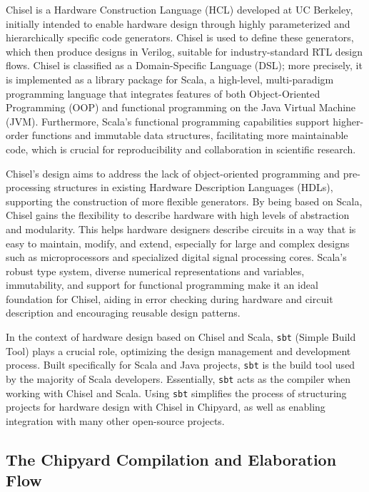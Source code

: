 Chisel is a Hardware Construction Language (HCL) developed at UC Berkeley, initially intended to enable hardware design through highly parameterized and hierarchically specific code generators. Chisel is used to define these generators, which then produce designs in Verilog, suitable for industry-standard RTL design flows. Chisel is classified as a Domain-Specific Language (DSL); more precisely, it is implemented as a library package for Scala, a high-level, multi-paradigm programming language that integrates features of both Object-Oriented Programming (OOP) and functional programming on the Java Virtual Machine (JVM). Furthermore, Scala's functional programming capabilities support higher-order functions and immutable data structures, facilitating more maintainable code, which is crucial for reproducibility and collaboration in scientific research.

Chisel's design aims to address the lack of object-oriented programming and pre-processing structures in existing Hardware Description Languages (HDLs), supporting the construction of more flexible generators. By being based on Scala, Chisel gains the flexibility to describe hardware with high levels of abstraction and modularity. This helps hardware designers describe circuits in a way that is easy to maintain, modify, and extend, especially for large and complex designs such as microprocessors and specialized digital signal processing cores. Scala's robust type system, diverse numerical representations and variables, immutability, and support for functional programming make it an ideal foundation for Chisel, aiding in error checking during hardware and circuit description and encouraging reusable design patterns.

In the context of hardware design based on Chisel and Scala, \texttt{sbt} (Simple Build Tool) plays a crucial role, optimizing the design management and development process. Built specifically for Scala and Java projects, \texttt{sbt} is the build tool used by the majority of Scala developers. Essentially, \texttt{sbt} acts as the compiler when working with Chisel and Scala. Using \texttt{sbt} simplifies the process of structuring projects for hardware design with Chisel in Chipyard, as well as enabling integration with many other open-source projects.

\subsection{The Chipyard Compilation and Elaboration Flow}
\label{subsec:chipyard_flow}

